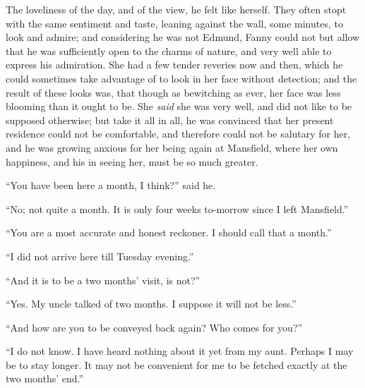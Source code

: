 The loveliness of the day, and of the view, he felt
like herself.  They often stopt with the same sentiment
and taste, leaning against the wall, some minutes,
to look and admire; and considering he was not Edmund,
Fanny could not but allow that he was sufficiently open
to the charms of nature, and very well able to express
his admiration.  She had a few tender reveries now and then,
which he could sometimes take advantage of to look in her
face without detection; and the result of these looks was,
that though as bewitching as ever, her face was less
blooming than it ought to be.  She \emph{said} she was
very well, and did not like to be supposed otherwise;
but take it all in all, he was convinced that her present
residence could not be comfortable, and therefore could
not be salutary for her, and he was growing anxious for
her being again at Mansfield, where her own happiness,
and his in seeing her, must be so much greater.

``You have been here a month, I think?'' said he.

``No; not quite a month.  It is only four weeks to-morrow
since I left Mansfield.''

``You are a most accurate and honest reckoner.  I should
call that a month.''

``I did not arrive here till Tuesday evening.''

``And it is to be a two months' visit, is not?''

``Yes.  My uncle talked of two months.  I suppose it
will not be less.''

``And how are you to be conveyed back again?  Who comes
for you?''

``I do not know.  I have heard nothing about it yet
from my aunt.  Perhaps I may be to stay longer.
It may not be convenient for me to be fetched exactly
at the two months' end.''

